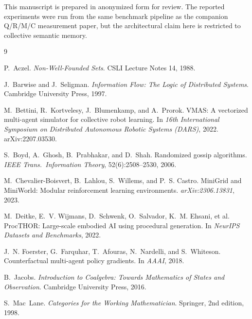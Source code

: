 \documentclass{article}
\begin{document}
\begin{ack}
This manuscript is prepared in anonymized form for review. The
reported experiments were run from the same benchmark pipeline as the
companion Q/R/M/C measurement paper, but the architectural claim here
is restricted to collective semantic memory.
\end{ack}

{\small
\begin{thebibliography}{9}

P.~Aczel.
\newblock \emph{Non-Well-Founded Sets}.
\newblock CSLI Lecture Notes 14, 1988.

J.~Barwise and J.~Seligman.
\newblock \emph{Information Flow: The Logic of Distributed Systems}.
\newblock Cambridge University Press, 1997.

M.~Bettini, R.~Kortvelesy, J.~Blumenkamp, and A.~Prorok.
\newblock VMAS: A vectorized multi-agent simulator for collective robot learning.
\newblock In \emph{16th International Symposium on Distributed Autonomous Robotic Systems (DARS)}, 2022.
\newblock arXiv:2207.03530.

S.~Boyd, A.~Ghosh, B.~Prabhakar, and D.~Shah.
\newblock Randomized gossip algorithms.
\newblock \emph{IEEE Trans.\ Information Theory}, 52(6):2508--2530, 2006.

M.~Chevalier-Boisvert, B.~Lahlou, S.~Willems, and P.~S. Castro.
\newblock MiniGrid and MiniWorld: Modular reinforcement learning environments.
\newblock \emph{arXiv:2306.13831}, 2023.

M.~Deitke, E.~V. Wijmans, D.~Schwenk, O.~Salvador, K.~M. Ehsani, et al.
\newblock ProcTHOR: Large-scale embodied AI using procedural generation.
\newblock In \emph{NeurIPS Datasets and Benchmarks}, 2022.

J.~N. Foerster, G.~Farquhar, T.~Afouras, N.~Nardelli, and S.~Whiteson.
\newblock Counterfactual multi-agent policy gradients.
\newblock In \emph{AAAI}, 2018.

B.~Jacobs.
\newblock \emph{Introduction to Coalgebra: Towards Mathematics of States and Observation}.
\newblock Cambridge University Press, 2016.

S.~Mac~Lane.
\newblock \emph{Categories for the Working Mathematician}.
\newblock Springer, 2nd edition, 1998.


\end{thebibliography}}
\end{document}
